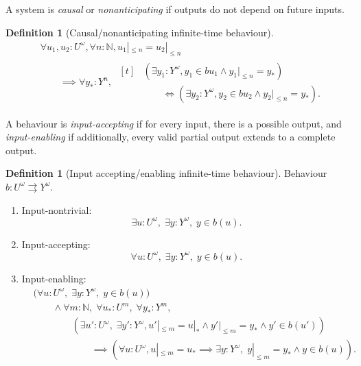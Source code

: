 \documentclass[11pt,a4paper]{article}
\newcommand{\N}{\mathbb{N}}
\newcommand{\mvto}{\rightrightarrows}
\theoremstyle{theorem}
\theoremstyle{definition}
\newtheorem{definition}[theorem]{Definition}
\theoremstyle{remark}
\begin{document}
A system is \emph{causal} or \emph{nonanticipating} if outputs do not depend on future inputs.
\begin{definition}[Causal/nonanticipating infinite-time behaviour]
\[ \begin{aligned}
  & \forall u_1,u_2:U^\omega, \forall n:\N,
u_1|_{\leq n} = u_2|_{\leq n} \\ & \qquad \implies \forall y_*:Y^n,\; \begin{aligned}[t]&(\exists y_1:Y^\omega, y_1 \in b u_1 \wedge y_1|_{\leq n} = y_*) \\
  & \qquad \iff (\exists y_2:Y^\omega, y_2 \in b u_2 \wedge y_2|_{\leq n}=y_*) .
  \end{aligned}  \end{aligned} \]
\end{definition}

A behaviour is \emph{input-accepting} if for every input, there is a possible output, and \emph{input-enabling} if additionally, every valid partial output extends to a complete output.
\begin{definition}[Input accepting/enabling infinite-time behaviour]
Behaviour $b:U^\omega \mvto Y^\omega$.
\begin{enumerate}
\item Input-nontrivial:
\[ \exists u:U^\omega,\; \exists y:Y^\omega,\; y \in b(u) . \]
\item Input-accepting:
\[ \forall u:U^\omega,\; \exists y:Y^\omega,\; y \in b(u) . \]
\item Input-enabling:
\[ \begin{aligned}
  &\bigl(\forall u:U^\omega,\; \exists y:Y^\omega,\;y\in b(u)\bigr) \\
  &\qquad \mbox{} \wedge \forall m:\N,\; \forall u_*:U^m,\; \forall y_*:Y^m, \\
  &\qquad\qquad (\exists u':U^\omega,\;\exists y':Y^\omega, u'|_{\leq m}=u|_* \wedge y'|_{\leq m}=y_* \wedge y' \in b(u') ) \\
  &\qquad\qquad\qquad \implies (\forall u:U^\omega, u|_{\leq m}=u_* \implies \exists y:Y^\omega,\;y|_{\leq m}=y_* \wedge y \in b(u)).
\end{aligned} \]
\end{enumerate}
\end{definition}
\end{document}
